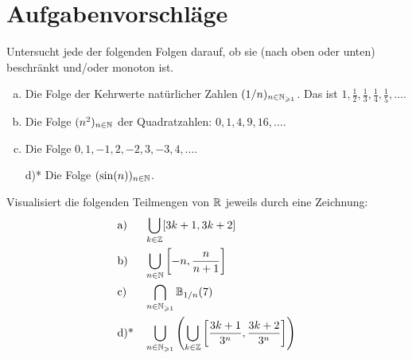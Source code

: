 \newpage
\section{Aufgabenvorschläge}










\begin{aufg}
Untersucht jede der folgenden Folgen darauf, ob sie (nach oben oder unten) beschränkt und/oder monoton ist.
\begin{enumerate}[a)]
  \item Die Folge der Kehrwerte natürlicher Zahlen $(1/n)_{n\in {\mathbb N}_{\geqslant 1}}$. Das ist  $1,\frac{1}{2},\frac{1}{3},\frac{1}{4},\frac{1}{5},\dots$.
  \item Die Folge $(n^2)_{n\in {\mathbb N}}$ der Quadratzahlen: $0,1,4,9,16,\dots$.
  \item Die Folge $0,1,-1,2,-2,3,-3,4,\dots$.
  \item[d)*] Die Folge $(\sin(n))_{n\in {\mathbb N}}$.
\end{enumerate}
\end{aufg}





\begin{aufg}
Visualisiert die folgenden Teilmengen von ${\mathbb R}$ jeweils durch eine Zeichnung:
\begin{align*}
 &\text{a)} && \bigcup_{k\in {\mathbb Z}} [3k+1,3k+2] \\
&\text{b)} && \bigcup_{n\in {\mathbb N}} \left[ -n, \frac{n}{n+1} \right] \\
 &\text{c)} && \bigcap_{n\in {\mathbb N}_{\geqslant 1}} \mathbb{B}_{1/n}(7) \\
 &\text{d)*} && \bigcup_{n\in {\mathbb N}_{\geqslant 1}} \left( \bigcup_{k\in {\mathbb Z}} \left[\frac{3k+1}{3^n},\frac{3k+2}{3^n} \right] \right)
\end{align*}
\end{aufg}





